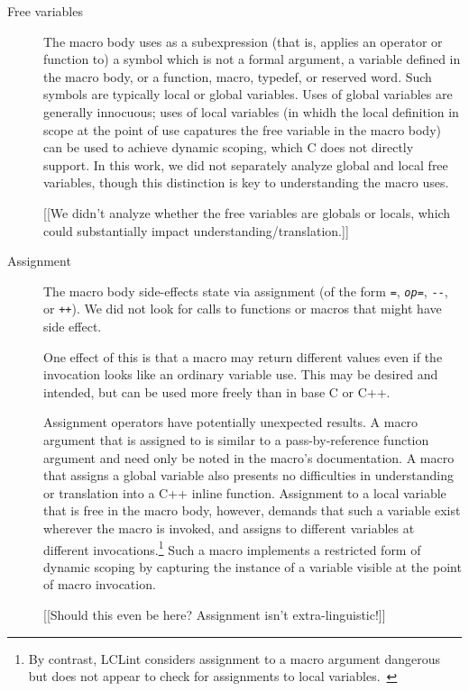 \label{desc:properties}

\begin{description}
\item[Free variables]
  The macro body uses as a subexpression (that is, applies an operator or
  function to) a symbol which is not a formal argument, a variable defined
  in the macro body, or a function, macro, typedef, or reserved word.  Such
  symbols are typically local or global variables.  Uses of global
  variables are generally innocuous; uses of local variables (in whidh the
  local definition in scope at the point of use capatures the free variable
  in the macro body) can be used to achieve dynamic scoping, which C does
  not directly support.  In this work, we did not separately analyze global
  and local free variables, though this distinction is key to understanding
  the macro uses.

  [[We didn't analyze whether the free variables are globals or locals,
          which could substantially impact understanding/translation.]]

\item[Assignment]
  The macro body side-effects state via assignment (of the form {\tt =},
  {\tt {\em op}=}, {\tt -{}-}, or {\tt ++}).  We did not look for calls to
  functions or macros that might have side effect.

  One effect of this is that a macro may return different values even if
  the invocation looks like an ordinary variable use.  This may be desired
  and intended, but can be used more freely than in base C or C++.

Assignment operators have potentially unexpected results.  A macro argument
that is assigned to is similar to a pass-by-reference function argument and
need only be noted in the macro's documentation.  A macro that assigns a
global variable also presents no difficulties in understanding or
translation into a C++ inline function.  Assignment to a local variable
that is free in the macro body, however, demands that such a variable exist
wherever the macro is invoked, and assigns to different variables at
different invocations.\footnote{By contrast, LCLint considers assignment to
  a macro argument dangerous but does not appear to check for assignments
  to local variables.~\cite{Evans:LCLint}} Such a macro implements a
restricted form of dynamic scoping by capturing the instance of a variable
visible at the point of macro invocation.

  [[Should this even be here?  Assignment isn't extra-linguistic!]]


\end{description}
